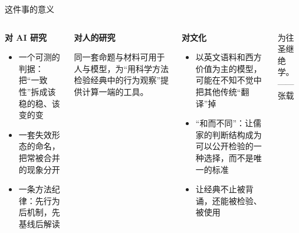 \documentclass[aspectratio=169,11pt,fontset=fandol]{ctexbeamer}
\newcommand{\hg}[1]{{\bfseries\color{golddeep}#1}}       %
\newcommand{\src}[1]{{\footnotesize\color{graytext}——#1}}
\begin{document}
\begin{frame}[t]{这件事的意义}
\begin{columns}[T,onlytextwidth]
\begin{thesis}
\hg{对 AI 研究}\par\vspace{2pt}
\small
\begin{itemize}\setlength{\itemsep}{2pt}
\item 一个可测的判据：把“一致性”拆成该稳的稳、该变的变
\item 一套失效形态的命名，把常被合并的现象分开
\item 一条方法纪律：先行为后机制，先基线后解读
\end{itemize}
\end{thesis}
\vspace{2pt}
\begin{thesis}
\hg{对人的研究}\par\vspace{2pt}
\small 同一套命题与材料可用于人与模型，为“用科学方法检验经典中的行为观察”提供计算一端的工具。
\end{thesis}
\begin{thesis}
\hg{对文化}\par\vspace{2pt}
\small
\begin{itemize}\setlength{\itemsep}{2pt}
\item 以英文语料和西方价值为主的模型，可能在不知不觉中把其他传统“翻译”掉
\item “和而不同”：让儒家的判断结构成为可以公开检验的一种选择，而不是唯一的标准
\item 让经典不止被背诵，还能被检验、被使用
\end{itemize}
\end{thesis}
\vspace{2pt}
\begin{classic}\small
为往圣继绝学。\hfill\src{张载}
\end{classic}
\end{columns}
\end{frame}
\end{document}
